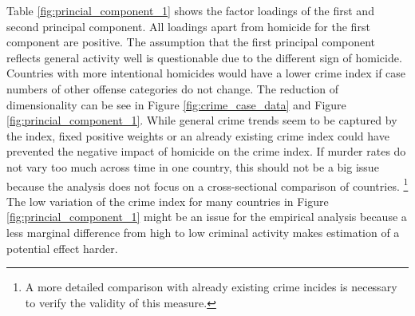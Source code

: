\documentclass[a4paper,12pt]{article}
\begin{document}
Table \ref{fig:princial_component_1} shows the factor loadings of the first and second principal component. All loadings apart from homicide for the first component are positive. The assumption that the first principal component reflects general activity well is questionable due to the different sign of homicide. Countries with more intentional homicides would have a lower crime index if case numbers of other offense categories do not change. The reduction of dimensionality can be see in Figure \ref{fig:crime_case_data} and Figure \ref{fig:princial_component_1}. While general crime trends seem to be captured by the index, fixed positive weights or an already existing crime index could have prevented the negative impact of homicide on the crime index. If murder rates do not vary too much across time in one country, this should not be a big issue because the analysis does not focus on a cross-sectional comparison of countries. \footnote{A more detailed comparison with already existing crime incides is necessary to verify the validity of this measure.}
The low variation of the crime index for many countries in Figure \ref{fig:princial_component_1} might be an issue for the empirical analysis because a less marginal difference from high to low criminal activity makes estimation of a potential effect harder. 
\end{document}
